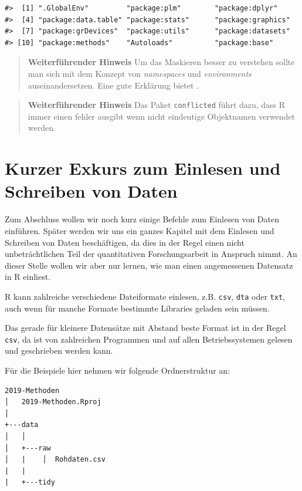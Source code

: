 \documentclass[]{book}
\begin{document}
\begin{verbatim}
#>  [1] ".GlobalEnv"         "package:plm"        "package:dplyr"     
#>  [4] "package:data.table" "package:stats"      "package:graphics"  
#>  [7] "package:grDevices"  "package:utils"      "package:datasets"  
#> [10] "package:methods"    "Autoloads"          "package:base"
\end{verbatim}

\begin{quote}
\textbf{Weiterführender Hinweis} Um das Maskieren besser zu verstehen
sollte man sich mit dem Konzept von \emph{namespaces} und
\emph{environments} auseinandersetzen. Eine gute Erklärung bietet
\citet{Packages}.
\end{quote}

\begin{quote}
\textbf{Weiterführender Hinweis} Das Paket \texttt{conflicted} führt
dazu, dass R immer einen fehler ausgibt wenn nicht eindeutige
Objektnamen verwendet werden.
\end{quote}

\section{Kurzer Exkurs zum Einlesen und Schreiben von
Daten}\label{kurzer-exkurs-zum-einlesen-und-schreiben-von-daten}

Zum Abschluss wollen wir noch kurz einige Befehle zum Einlesen von Daten
einführen. Später werden wir uns ein ganzes Kapitel mit dem Einlesen und
Schreiben von Daten beschäftigen, da dies in der Regel einen nicht
unbeträchtlichen Teil der quantitativen Forschungsarbeit in Anspruch
nimmt. An dieser Stelle wollen wir aber nur lernen, wie man einen
angemessenen Datensatz in R einliest.

R kann zahlreiche verschiedene Dateiformate einlesen, z.B. \texttt{csv},
\texttt{dta} oder \texttt{txt}, auch wenn für manche Formate bestimmte
Libraries geladen sein müssen.

Das gerade für kleinere Datensätze mit Abstand beste Format ist in der
Regel \texttt{csv}, da ist von zahlreichen Programmen und auf allen
Betriebssystemen gelesen und geschrieben werden kann.

Für die Beispiele hier nehmen wir folgende Ordnerstruktur an:

\begin{verbatim}
2019-Methoden
│   2019-Methoden.Rproj
│
+---data
│   │
│   +---raw
│   |    │  Rohdaten.csv
|   |
|   +---tidy
\end{verbatim}
\end{document}
